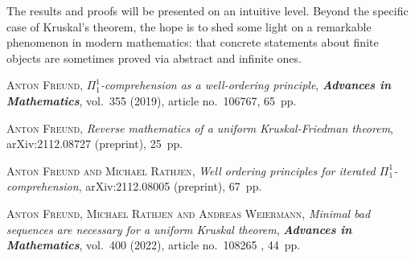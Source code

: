 \documentclass[bsl,meeting]{asl}
\begin{document}
The results and proofs will be presented on an intuitive level. Beyond the specific case of Kruskal's theorem, the hope is to shed some light on a remarkable phenomenon in modern mathematics: that concrete statements about finite objects are sometimes proved via abstract and infinite ones.

\begin{thebibliography}{10}

{\scshape Anton Freund},
{\itshape {$\Pi^1_1$}-comprehension as a well-ordering principle},
{\bfseries\itshape Advances in Mathematics},
vol.~355 (2019), article no.~106767, 65~pp.

{\scshape Anton Freund},
{\itshape Reverse mathematics of a uniform Kruskal-Friedman theorem},
arXiv:2112.08727 (preprint), 25~pp.

{\scshape Anton Freund and Michael Rathjen},
{\itshape Well ordering principles for iterated {$\Pi^1_1$}-comprehension},
arXiv:2112.08005 (preprint), 67~pp.

{\scshape Anton Freund, Michael Rathjen and Andreas Weiermann},
{\itshape Minimal bad sequences are necessary for a uniform Kruskal theorem},
{\bfseries\itshape Advances in Mathematics},
vol.~400 (2022), article no.~108265 , 44~pp.
\end{thebibliography}
\end{document}
